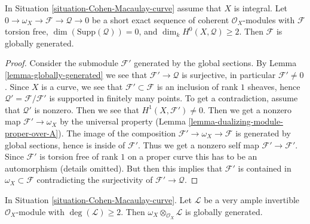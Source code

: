 \begin{lemma}
\label{lemma-globally-generated-curve}
In Situation \ref{situation-Cohen-Macaulay-curve} assume that
$X$ is integral. Let $0 \to \omega_X \to \mathcal{F} \to \mathcal{Q} \to 0$
be a short exact sequence of coherent $\mathcal{O}_X$-modules with
$\mathcal{F}$ torsion free, $\dim(\text{Supp}(\mathcal{Q})) = 0$,
and $\dim_k H^0(X, \mathcal{Q}) \geq 2$. Then $\mathcal{F}$
is globally generated.
\end{lemma}

\begin{proof}
Consider the submodule $\mathcal{F}'$ generated by the global sections. By
Lemma \ref{lemma-globally-generated} we see that $\mathcal{F}' \to \mathcal{Q}$
is surjective, in particular $\mathcal{F}' \not = 0$. Since $X$ is a curve, we
see that $\mathcal{F}' \subset \mathcal{F}$ is an inclusion of rank $1$
sheaves, hence $\mathcal{Q}' = \mathcal{F}/\mathcal{F}'$ is supported in
finitely many points. To get a contradiction, assume that
$\mathcal{Q}'$ is nonzero. Then we see that $H^1(X, \mathcal{F}') \not = 0$.
Then we get a nonzero map $\mathcal{F}' \to \omega_X$ by the universal
property (Lemma \ref{lemma-dualizing-module-proper-over-A}).
The image of the composition $\mathcal{F}' \to \omega_X \to \mathcal{F}$
is generated by global sections, hence is inside of $\mathcal{F}'$.
Thus we get a nonzero self map $\mathcal{F}' \to \mathcal{F}'$.
Since $\mathcal{F}'$ is torsion free of rank $1$ on a proper curve
this has to be an automorphism (details omitted). But then this implies that
$\mathcal{F}'$ is contained in $\omega_X \subset \mathcal{F}$
contradicting the surjectivity of $\mathcal{F}' \to \mathcal{Q}$.
\end{proof}

\begin{lemma}
\label{lemma-tensor-omega-with-globally-generated-invertible}
In Situation \ref{situation-Cohen-Macaulay-curve}. Let $\mathcal{L}$
be a very ample invertible $\mathcal{O}_X$-module with
$\deg(\mathcal{L}) \geq 2$. Then
$\omega_X \otimes_{\mathcal{O}_X} \mathcal{L}$ is globally generated.
\end{lemma}

